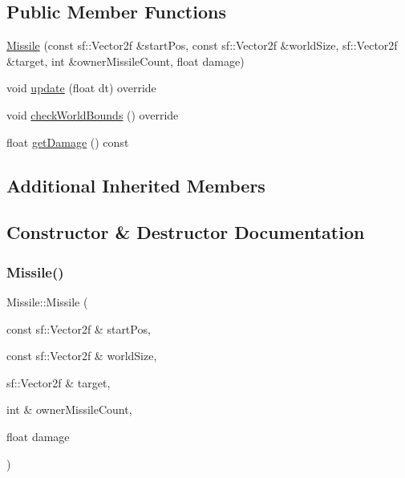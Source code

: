 \subsection*{Public Member Functions}
\begin{DoxyCompactItemize}
\item 
\hyperlink{class_missile_a74052851a2f92d2045198c19171c1dbb}{Missile} (const sf\+::\+Vector2f \&start\+Pos, const sf\+::\+Vector2f \&world\+Size, sf\+::\+Vector2f \&target, int \&owner\+Missile\+Count, float damage)
\item 
void \hyperlink{class_missile_a5750280ac2f18df9cf3f5f87341be655}{update} (float dt) override
\item 
void \hyperlink{class_missile_a49c9929ea51ad8a2a8da96e0c39e6095}{check\+World\+Bounds} () override
\item 
float \hyperlink{class_missile_ae07a94126a1475af4349006dc825dae9}{get\+Damage} () const
\end{DoxyCompactItemize}
\subsection*{Additional Inherited Members}


\subsection{Constructor \& Destructor Documentation}
\mbox{\label{class_missile_a74052851a2f92d2045198c19171c1dbb}} 
\subsubsection{\texorpdfstring{Missile()}{Missile()}}
{\footnotesize\ttfamily Missile\+::\+Missile (\begin{DoxyParamCaption}\item[{const sf\+::\+Vector2f \&}]{start\+Pos,  }\item[{const sf\+::\+Vector2f \&}]{world\+Size,  }\item[{sf\+::\+Vector2f \&}]{target,  }\item[{int \&}]{owner\+Missile\+Count,  }\item[{float}]{damage }\end{DoxyParamCaption})}

